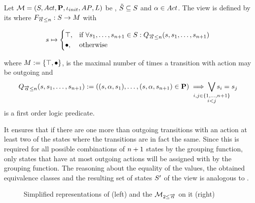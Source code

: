 \documentclass[preview]{standalone}
\begin{document}
\begin{definition}
	Let $\chgph = \chgphtuple$ be \achgphN, $\smstates \subseteq \states$ and $\action \in \actions$. The view \viewmaxoutaction is defined by its \grpfctN where $\gfctsubmaxoutaction : \states \to \arbset$ with
	
	\[
	\state \mapsto
	\begin{cases}
			\group,				& \text{if } \forall \state_1, \dots, \state_{\numoutact+1} \in \states: \predmaxoutact \\
			\remelem,          	& \text{otherwise}
		\end{cases}
	\]
	
	where $\imggrp := \imggrpbinview$,
	is the maximal number of times a transition with action \action may be outgoing and 
	\[
	\predmaxoutact := ((\state, \action, \state_1), \dots, (\state, \action, \state_{\numoutact+1}) \in \trans) \implies \bigvee_{\mathclap{\substack{i,j \in \{1,\dots, \numoutact+1\} \\ i < j}}} \state_i = \state_j
	\]
	is a first order logic predicate.
	\label{def:viewmaxoutaction}
\end{definition}

It ensures that if there are one more than \numoutact outgoing transitions with an action \action at least two of the states where the transitions  are in fact the same. Since this is required for all possible combinations of $\numoutact + 1$ states by the grouping function, only states that have at most \numoutact outgoing actions will be assigned with \action by the grouping function. The reasoning about the equality of the \grpfctN values, the obtained equivalence classes and the resulting set of states $\states'$ of the view is analogous to \viewminoutaction.

\begin{figure}[h]
	\begin{minipage}{.5\textwidth}
		\hspace{5mm}
		
	\end{minipage}%
	\begin{minipage}{.5\textwidth}
		\hspace{5mm}
		
	\end{minipage}
	\caption{Simplified representations of \mdp (left) and the \viewN $\view[\pptyminoutact{2}{\outact}]$ on it (right)}
	\label{fig:outActMinAfter}  
\end{figure}
\end{document}
